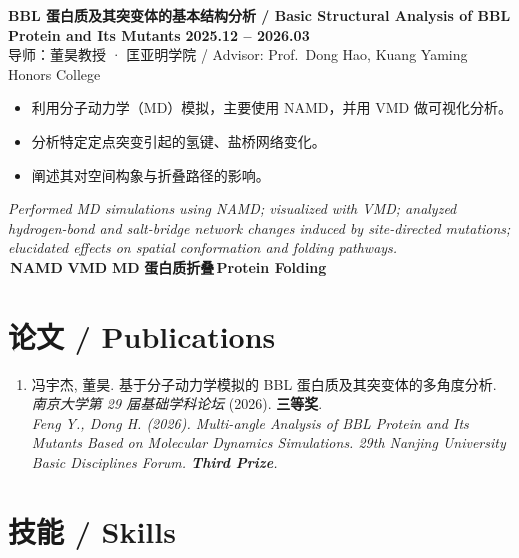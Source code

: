 \documentclass[11pt,a4paper]{article}
\newcommand{\purplechip}[1]{\colorbox{njupurplelight}{\textcolor{njupurple}{\footnotesize\bfseries\,#1\,}}}
\newcommand{\bluechip}[1]{\colorbox{njubluelight}{\textcolor{njublue}{\footnotesize\bfseries\,#1\,}}}
\newcommand{\cvdateinline}[1]{{\color{njublue}\small\bfseries #1}}
\newcommand{\cvaward}[1]{{\color{njupurple}\bfseries #1}}
\newcommand{\muted}[1]{{\color{mutedgray}\small #1}}
\begin{document}
\begin{rscard}
{\bfseries BBL 蛋白质及其突变体的基本结构分析 \;/\; Basic Structural Analysis of BBL Protein and Its Mutants} \hfill \cvdateinline{2025.12 -- 2026.03}\\[2pt]
{\small\muted{导师：董昊教授 · 匡亚明学院 \;/\; Advisor: Prof.\ Dong Hao, Kuang Yaming Honors College}}\\[2pt]
\begin{itemize}
  \item 利用分子动力学（MD）模拟，主要使用 NAMD，并用 VMD 做可视化分析。
  \item 分析特定定点突变引起的氢键、盐桥网络变化。
  \item 阐述其对空间构象与折叠路径的影响。
\end{itemize}
{\itshape\small Performed MD simulations using NAMD; visualized with VMD; analyzed hydrogen-bond and salt-bridge network changes induced by site-directed mutations; elucidated effects on spatial conformation and folding pathways.}\\[4pt]
\hfill\bluechip{NAMD}\bluechip{VMD}\purplechip{MD}\purplechip{蛋白质折叠\,Protein Folding}
\end{rscard}

\section*{论文 \quad / \quad Publications}

\begin{enumerate}[leftmargin=18pt,nosep,label=\arabic*.]
\item 冯宇杰, 董昊. 基于分子动力学模拟的 BBL 蛋白质及其突变体的多角度分析. \textit{南京大学第 29 届基础学科论坛} (2026). \cvaward{三等奖}.\\[2pt]
{\itshape\small Feng Y., Dong H. (2026). \textit{Multi-angle Analysis of BBL Protein and Its Mutants Based on Molecular Dynamics Simulations.} 29th Nanjing University Basic Disciplines Forum. \cvaward{Third Prize}.}
\end{enumerate}

\section*{技能 \quad / \quad Skills}
\end{document}

